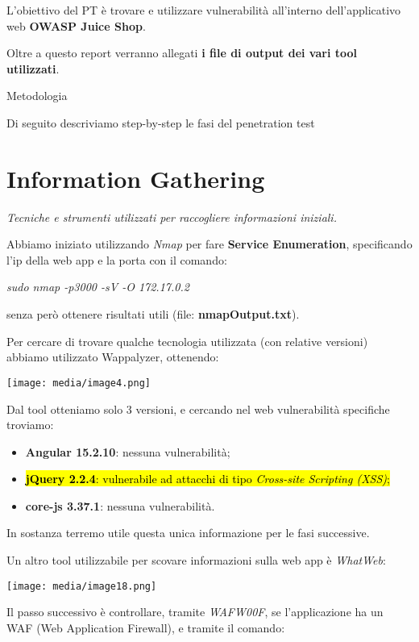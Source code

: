 L'obiettivo del PT è trovare e utilizzare vulnerabilità all'interno
dell'applicativo web \textbf{OWASP Juice Shop}.

Oltre a questo report verranno allegati \textbf{i file di output dei
vari tool utilizzati}.

Metodologia

Di seguito descriviamo step-by-step le fasi del penetration test

\section{Information Gathering}\label{information-gathering}

\emph{Tecniche e strumenti utilizzati per raccogliere informazioni
iniziali.}

Abbiamo iniziato utilizzando \emph{Nmap} per fare \textbf{Service
Enumeration}, specificando l'ip della web app e la porta con il comando:

\emph{sudo nmap -p3000 -sV -O 172.17.0.2}

senza però ottenere risultati utili (file: \textbf{nmapOutput.txt}).

Per cercare di trovare qualche tecnologia utilizzata (con relative
versioni) abbiamo utilizzato Wappalyzer, ottenendo:

\texttt{[image: media/image4.png]}

Dal tool otteniamo solo 3 versioni, e cercando nel web vulnerabilità
specifiche troviamo:

\begin{itemize}
\item
  \textbf{Angular 15.2.10}: nessuna vulnerabilità;
\item
  \hl{\textbf{jQuery 2.2.4}: vulnerabile ad attacchi di tipo
  \emph{Cross-site Scripting (XSS)};}
\item
  \textbf{core-js 3.37.1}: nessuna vulnerabilità.
\end{itemize}

In sostanza terremo utile questa unica informazione per le fasi
successive.

Un altro tool utilizzabile per scovare informazioni sulla web app è
\emph{WhatWeb}:

\texttt{[image: media/image18.png]}

Il passo successivo è controllare, tramite \emph{WAFW00F}, se
l'applicazione ha un WAF (Web Application Firewall), e tramite il
comando:

